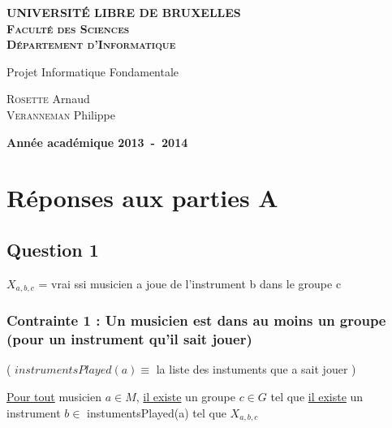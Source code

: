 \documentclass[a4paper,10pt]{article}
\begin{document}
\begin{titlepage}
    \begin{center}
        \textbf{\textsc{UNIVERSIT\'E LIBRE DE BRUXELLES}}\\
        \textbf{\textsc{Faculté des Sciences}}\\
        \textbf{\textsc{Département d'Informatique}}

        \vfill{}\vfill{}

        \begin{center}
            \Huge{Projet Informatique Fondamentale}
        \end{center}
        \Huge{\par}
        \begin{center}
            \large{
                \textsc{Rosette} Arnaud \\
                \textsc{Veranneman} Philippe
            }
        \end{center}
        \Huge{\par}

        \vfill{}\vfill{}

        \vfill{}\vfill{}\enlargethispage{3cm}

        \textbf{Année académique 2013~-~2014}
    \end{center}
\end{titlepage}


\tableofcontents
\pagebreak

\section{Réponses aux parties A}

\subsection{Question 1}

$X_{a,b,c}$ = vrai ssi musicien a joue de l'instrument b dans le groupe c

\subsubsection{Contrainte 1 : Un musicien est dans au moins un groupe (pour un instrument qu'il sait jouer)}


( $instrumentsPlayed(a) \equiv$ la liste des instuments que a sait jouer )


\underline{Pour tout} musicien $a \in M $, \underline{il existe} un groupe $c \in G$ tel que \underline{il existe} un instrument $b \in$ instumentsPlayed(a)  tel que $X_{a,b,c}$
\end{document}
